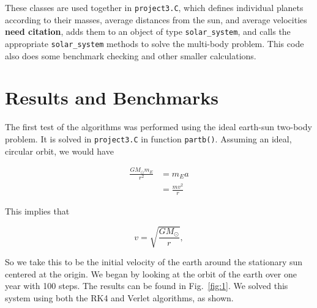 \documentclass[12pt]{article}
\numberwithin{equation}{section}
\begin{document}
\par These classes are used together in \texttt{project3.C}, which defines individual planets according to their masses, average distances from the sun, and average velocities \textbf{need citation}, adds them to an object of type \texttt{solar\_system}, and calls the appropriate \texttt{solar\_system} methods to solve the multi-body problem.  This code also does some benchmark checking and other smaller calculations.

\section{Results and Benchmarks}
\label{sec:results}

The first test of the algorithms was performed using the ideal earth-sun two-body problem.  It is solved in \texttt{project3.C} in function \texttt{partb()}.  Assuming an ideal, circular orbit, we would have

\begin{align*}
\frac{GM_{\odot}m_{E}}{r^{2}} & = m_{E}a \\
& = \frac{mv^{2}}{r}
\end{align*}

\noindent This implies that

\begin{equation}
v = \sqrt{\frac{GM_{\odot}}{r}},
\end{equation}

\noindent So we take this to be the initial velocity of the earth around the stationary sun centered at the origin.  We began by looking at the orbit of the earth over one year with 100 steps.  The results can be found in Fig.~\ref{fig:1}.  We solved this system using both the RK4 and Verlet algorithms, as shown.  
\end{document}
